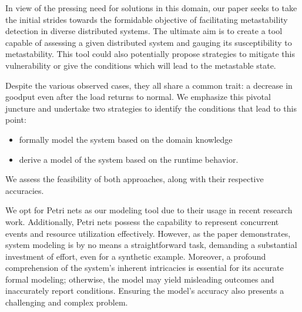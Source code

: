 In view of the pressing need for solutions in this domain, our paper seeks to take the initial strides towards the formidable objective of facilitating metastability detection in diverse distributed systems. The ultimate aim is to create a tool capable of assessing a given distributed system and gauging its susceptibility to metastability. This tool could also potentially propose strategies to mitigate this vulnerability or give the conditions which will lead to the metastable state.

Despite the various observed cases, they all share a common trait: a decrease in goodput even after the load returns to normal. We emphasize this pivotal juncture and undertake two strategies to identify the conditions that lead to this point:
\begin{itemize}
    \item formally model the system based on the domain knowledge
    \item derive a model of the system based on the runtime behavior.            
\end{itemize}
We assess the feasibility of both approaches, along with their respective accuracies.

We opt for Petri nets as our modeling tool due to their usage in recent research work. Additionally, Petri nets possess the capability to represent concurrent events and resource utilization effectively. However, as the paper demonstrates, system modeling is by no means a straightforward task, demanding a substantial investment of effort, even for a synthetic example. Moreover, a profound comprehension of the system's inherent intricacies is essential for its accurate formal modeling; otherwise, the model may yield misleading outcomes and inaccurately report conditions. Ensuring the model's accuracy also presents a challenging and complex problem.
